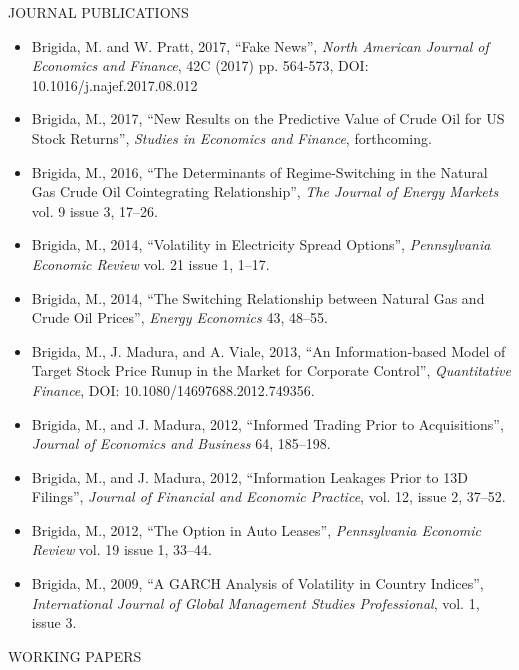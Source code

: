 \documentclass[9pt]{article}
\begin{document}
\vspace{10pt}
JOURNAL PUBLICATIONS
\begin{itemize}[noitemsep, nolistsep]
\item Brigida, M. and W. Pratt, 2017, ``Fake News'', {\it North American Journal of Economics and Finance\/}, 42C (2017) pp. 564-573, DOI: 10.1016/j.najef.2017.08.012
\item Brigida, M., 2017, ``New Results on the Predictive Value of Crude Oil for US Stock Returns'', {\it Studies in Economics and Finance}, forthcoming.
\item Brigida, M., 2016, ``The Determinants of Regime-Switching in the Natural Gas Crude Oil Cointegrating Relationship'', {\it The Journal of Energy Markets} vol. 9 issue 3, 17--26.
\item Brigida, M., 2014, ``Volatility in Electricity Spread Options'', {\it Pennsylvania Economic Review} vol. 21 issue 1, 1--17.
\item Brigida, M., 2014, ``The Switching Relationship between Natural Gas and Crude Oil Prices'', {\it Energy Economics\/} 43, 48--55.  
\item Brigida, M., J. Madura, and A. Viale, 2013, ``An Information-based Model of Target Stock Price Runup in the Market for Corporate Control'', {\it Quantitative Finance\/}, DOI: 10.1080/14697688.2012.749356.
\item Brigida, M., and J. Madura, 2012, ``Informed Trading Prior to Acquisitions'', {\it Journal of Economics and Business} 64, 185--198.
\item Brigida, M., and J. Madura, 2012, ``Information Leakages Prior to 13D Filings'', {\it Journal of Financial and Economic Practice}, vol. 12, issue 2, 37--52.
\item Brigida, M., 2012, ``The Option in Auto Leases'', {\it Pennsylvania Economic Review} vol. 19 issue 1, 33--44.
\item Brigida, M., 2009, ``A GARCH Analysis of Volatility in Country Indices'', {\it International Journal of Global Management Studies Professional}, vol. 1, issue 3.
\end{itemize}
\vspace{10pt}
WORKING PAPERS
\end{document}
